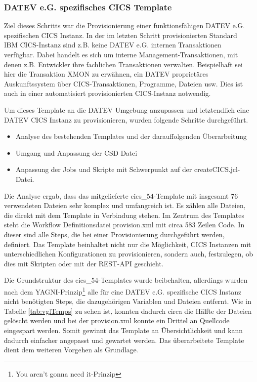 \subsubsection{DATEV e.G. spezifisches CICS Template}\label{sssec:datevcics}
Ziel dieses  Schritts war die Provisionierung einer funktionsfähigen DATEV e.G. spezifischen CICS Instanz. 
In der im letzten Schritt provisionierten Standard IBM CICS-Instanz sind z.B. keine DATEV e.G. internen Transaktionen verfügbar.
Dabei handelt es sich um interne Management-Transaktionen, mit denen z.B. Entwickler ihre fachlichen Transaktionen verwalten. 
Beispielhaft sei hier die Transaktion XMON zu erwähnen, ein DATEV proprietäres Auskunftssystem über CICS-Transaktionen, Programme, Dateien usw.
Dies ist auch in einer automatisiert provisionierten CICS-Instanz notwendig.

Um dieses Template an die DATEV Umgebung anzupassen und letztendlich eine \glqq DATEV CICS Instanz\grqq{} zu provisionieren, wurden folgende Schritte durchgeführt.

\begin{samepage}
\begin{itemize}
\item Analyse des bestehenden Templates und der darauffolgenden Überarbeitung 
\item Umgang und Anpassung der CSD Datei
\item Anpassung der Jobs und Skripte mit Schwerpunkt auf der \glqq createCICS.jcl\grqq-Datei.
\end{itemize}
\end{samepage}

Die Analyse ergab, dass das mitgelieferte \glqq cics\_54\grqq-Template mit insgesamt 76 verwendeten Dateien sehr komplex und umfangreich ist.
Es zählen alle Dateien, die direkt mit dem Template in Verbindung stehen.
Im Zentrum des Templates steht die Workflow Definitionsdatei \glqq provision.xml \grqq{} mit circa 583 Zeilen Code.
In dieser sind alle Steps, die bei einer Provisionierung durchgeführt werden, definiert.
Das Template beinhaltet nicht nur die Möglichkeit, CICS Instanzen mit unterschiedlichen Konfigurationen zu provisionieren, sondern auch, festzulegen, ob dies mit Skripten oder mit der REST-API geschieht.

Die Grundstruktur des \glqq cics\_54\grqq-Templates wurde beibehalten, allerdings wurden nach dem \glqq YAGNI\grqq-Prinzip\footnote{\glqq You aren't gonna need it\glqq-Prinzip} alle für eine DATEV e.G. spezifische CICS Instanz nicht benötigten Steps, die dazugehörigen Variablen und Dateien entfernt.
Wie in Tabelle \ref{tab:vglTemps} zu sehen ist, konnten dadurch circa die Hälfte der Dateien gelöscht werden und bei der provision.xml konnte ein Drittel an Quellcode eingespart werden.
Somit gewinnt das Template an Übersichtlichkeit und kann dadurch einfacher angepasst und gewartet werden.
Das überarbeitete Template dient dem weiteren Vorgehen als Grundlage.

